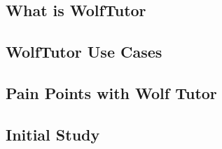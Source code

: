 \subsection{What is WolfTutor}
\label{sec:what-wolftutor}

\subsection{WolfTutor Use Cases}
\label{sec:wolftutor-use-cases}

\subsection{Pain Points with Wolf Tutor}
\label{sec:pain-points-with}

\subsection{Initial Study}
\label{sec:initial-study}

